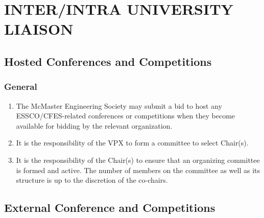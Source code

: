 


% 

\hypertarget{interintra-university-liaison}{%
 \section{INTER/INTRA UNIVERSITY
   LIAISON}
 \label{interintra-university-liaison}}

\hypertarget{hosted-conferences-and-competitions}{%
 \subsection{Hosted Conferences and
  Competitions}
 \label{hosted-conferences-and-competitions}}

\hypertarget{general}{%
 \subsubsection{General}
 \label{general}}

\begin{enumerate}
 \item
  The McMaster Engineering Society may submit a bid to host any
  ESSCO/CFES-related conferences or competitions when they become
  available for bidding by the relevant organization.
 \item
  It is the responsibility of the VPX to form a committee to select
  Chair(s).
 \item
  It is the responsibility of the Chair(s) to ensure that an organizing
  committee is formed and active. The number of members on the committee
  as well as its structure is up to the discretion of the co-chairs.

\end{enumerate}

\hypertarget{external-conference-and-competitions}{%
 \subsection{External Conference and
  Competitions}
 \label{external-conference-and-competitions}}

